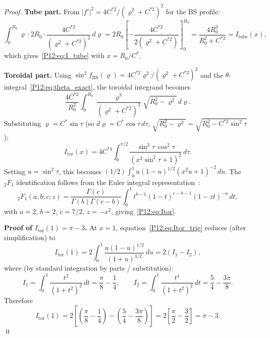 \documentclass[11pt,a4paper]{article}
\theoremstyle{definition}
\theoremstyle{remark}
\newcommand{\bsF}{{}_2F_1}
\begin{document}
\begin{proof}
\textbf{Tube part.}
From $|f'|^2 = 4C^{*2}/(\varrho^2+C^{*2})^2$ for the BS profile:
\[
  \int_0^{R_0}\varrho\cdot 2R_0\cdot\frac{4C^{*2}}{(\varrho^2+C^{*2})^2}\,d\varrho
  = 2R_0\left[-\frac{4C^{*2}}{2(\varrho^2+C^{*2})}\right]_0^{R_0}
  = \frac{4R_0^3}{R_0^2+C^{*2}} = I_{\mathrm{tube}}(x),
\]
which gives~\eqref{P12:eq:I_tube} with $x=R_0/C^*$.

\textbf{Toroidal part.}
Using $\sin^2\!f_{\mathrm{BS}}(\varrho)=4C^{*2}\varrho^2/(\varrho^2+C^{*2})^2$
and the $\theta$-integral~\eqref{P12:eq:theta_exact}, the toroidal integrand becomes
\[
  \frac{4C^{*2}}{R_0^2}\int_0^{R_0}\frac{\varrho^3}{(\varrho^2+C^{*2})^2}
  \sqrt{R_0^2-\varrho^2}\,d\varrho.
\]
Substituting $\varrho=C^*\sin\tau$ (so $d\varrho=C^*\cos\tau\,d\tau$,
$\sqrt{R_0^2-\varrho^2}=\sqrt{R_0^2-C^{*2}\sin^2\!\tau}$):
\begin{equation}
  I_{\mathrm{tor}}(x)
  = 4C^{*4}\int_0^{\pi/2}
    \frac{\sin^3\!\tau\,\cos^2\!\tau}{(x^2\sin^2\!\tau+1)^2}\,d\tau.
  \label{P12:eq:Itor_trig}
\end{equation}
Setting $u=\sin^2\!\tau$, this becomes
$(1/2)\int_0^1 u(1-u)^{1/2}(x^2u+1)^{-2}\,du$.
The $\bsF$ identification follows from the Euler
integral representation~\cite{AS65}:
\[
  \bsF(a,b;c;z) = \frac{\Gamma(c)}{\Gamma(b)\Gamma(c-b)}
  \int_0^1 t^{b-1}(1-t)^{c-b-1}(1-zt)^{-a}\,dt,
\]
with $a=2$, $b=2$, $c=7/2$, $z=-x^2$, giving~\eqref{P12:eq:Itor}.

\textbf{Proof of $I_{\mathrm{tor}}(1)=\pi-3$.}
At $x=1$, equation~\eqref{P12:eq:Itor_trig} reduces (after simplification)
to
\begin{equation}
  I_{\mathrm{tor}}(1)
  = 2\!\int_0^1\!\frac{u(1-u)^{1/2}}{(1+u)^{3/2}}\,du
  = 2(I_1 - I_2),
  \label{P12:eq:Itor1_split}
\end{equation}
where (by standard integration by parts / substitution):
\begin{equation}
  I_1 = \int_0^1\frac{t^2}{(1+t^2)^2}\,dt = \frac{\pi}{8}-\frac{1}{4},
  \qquad
  I_2 = \int_0^1\frac{t^4}{(1+t^2)^2}\,dt = \frac{5}{4}-\frac{3\pi}{8}.
  \label{P12:eq:I1I2}
\end{equation}
Therefore
\begin{equation}
  I_{\mathrm{tor}}(1)
  = 2\!\left[\left(\frac{\pi}{8}-\frac{1}{4}\right)
             -\left(\frac{5}{4}-\frac{3\pi}{8}\right)\right]
  = 2\!\left[\frac{\pi}{2}-\frac{3}{2}\right]
  = \pi - 3.
  \label{P12:eq:Itor1_value}
\end{equation}
\qed
\end{proof}
\end{document}
